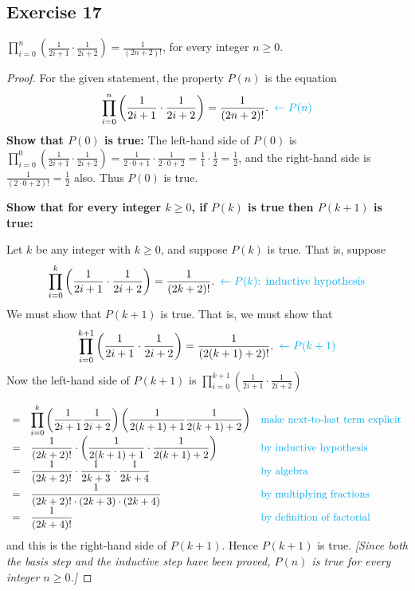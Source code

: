 \documentclass[14pt]{extarticle}
\newcommand{\dps}{\displaystyle}
\newcommand{\from}{\leftarrow}
\newcommand{\cy}{\color{cyan}}
\begin{document}
\subsection{Exercise 17}
$\dps \prod_{i=0}^{n}\left(\frac{1}{2i+1} \cdot \frac{1}{2i+2}\right) = \frac{1}{(2n+2)!}$, for every integer $n \geq 0$.

\begin{proof}
For the given statement, the property $P(n)$ is the equation
\[
\dps \prod_{i=0}^{n}\left(\frac{1}{2i+1} \cdot \frac{1}{2i+2}\right) = \frac{1}{(2n+2)!}. \,\,\, {\cy \from P(n)}
\]
{\bf Show that $P(0)$ is true:} The left-hand side of $P(0)$ is $\dps \prod_{i=0}^{0}\left(\frac{1}{2i+1} \cdot \frac{1}{2i+2}\right) = \frac{1}{2\cdot0+1} \cdot \frac{1}{2\cdot0+2} = \frac{1}{1}\cdot \frac{1}{2} = \frac{1}{2}$, and the right-hand side is $\dps \frac{1}{(2\cdot 0 +2)!} = \frac{1}{2}$ also. Thus $P(0)$ is true.

{\bf Show that for every integer $k \geq 0$, if $P(k)$ is true then $P(k + 1)$ is true:}

Let $k$ be any integer with $k \geq 0$, and suppose $P(k)$ is true. That is, suppose
\[
\dps \prod_{i=0}^{k}\left(\frac{1}{2i+1} \cdot \frac{1}{2i+2}\right) = \frac{1}{(2k+2)!}. \,\,\, {\cy \from P(k) \text{: inductive hypothesis}}
\]
We must show that $P(k + 1)$ is true. That is, we must show that
\[
\dps \prod_{i=0}^{k+1}\left(\frac{1}{2i+1} \cdot \frac{1}{2i+2}\right) = \frac{1}{(2(k+1)+2)!}. \,\,\,{\cy \from P(k+1)}
\]
Now the left-hand side of $P(k + 1)$ is $\dps \prod_{i=0}^{k+1}\left(\frac{1}{2i+1} \cdot \frac{1}{2i+2}\right)$

\[
\begin{array}{lll}
= & \dps \prod_{i=0}^{k}\left(\frac{1}{2i+1} \frac{1}{2i+2}\right) \left(\frac{1}{2(k+1)+1} \frac{1}{2(k+1)+2}\right) & \text{\cy make next-to-last term explicit} \\
= & \dps \frac{1}{(2k+2)!} \cdot \left(\frac{1}{2(k+1)+1} \cdot \frac{1}{2(k+1)+2}\right) & \text{\cy by inductive hypothesis} \\
= & \dps \frac{1}{(2k+2)!} \cdot \frac{1}{2k+3} \cdot \frac{1}{2k+4} & \text{\cy by algebra} \\
= & \dps \frac{1}{(2k+2)!\cdot(2k+3)\cdot(2k+4)} & \text{\cy by multiplying fractions} \\
= & \dps \frac{1}{(2k+4)!} & \text{\cy by definition of factorial}
\end{array}
\]
and this is the right-hand side of $P(k + 1)$. Hence $P(k + 1)$ is true. {\it [Since both the basis step and the inductive step have been proved, $P(n)$ is true for every integer $n \geq 0$.]}
\end{proof}
\end{document}
